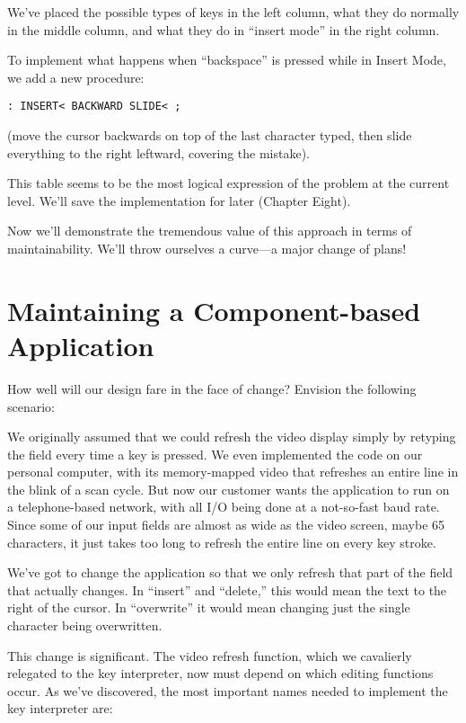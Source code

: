 We've placed the possible types of keys in the left column, what they do
normally in the middle column, and what they do in ``insert mode'' in the
right column.

To implement what happens when ``backspace'' is pressed while in
Insert Mode, we add a new procedure:

\begin{verbatim}
: INSERT< BACKWARD SLIDE< ;
\end{verbatim}

(move the cursor backwards on top of the last character typed, then slide
everything to the right leftward, covering the mistake).

This table seems to be the most logical expression of the problem at
the current level. We'll save the implementation for later (Chapter Eight).

Now we'll demonstrate the tremendous value of this approach in
terms of maintainability. We'll throw ourselves a curve---a major change
of plans!

\section{Maintaining a Component-based Application}

How well will our design fare in the face of change? Envision the following
scenario:

We originally assumed that we could refresh the video display simply
by retyping the field every time a key is pressed. We even implemented
the code on our personal computer, with its memory-mapped video that
refreshes an entire line in the blink of a scan cycle. But now our
customer wants the application to run on a telephone-based network,
with all I/O being done at a not-so-fast baud rate. Since some of our
input fields are almost as wide as the video screen, maybe 65
characters, it just takes too long to refresh the entire line on every
key stroke.

We've got to change the application so that we only refresh that
part of the field that actually changes. In ``insert'' and ``delete,'' this
would mean the text to the right of the cursor. In ``overwrite'' it would
mean changing just the single character being overwritten.

This change is significant. The video refresh function, which we
cavalierly relegated to the key interpreter, now must depend on which
editing functions occur. As we've discovered, the most important names
needed to implement the key interpreter are:

